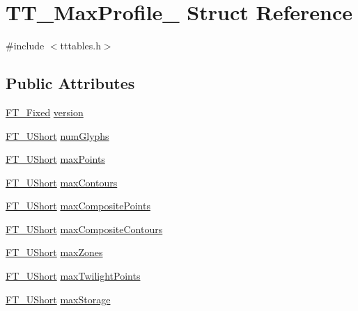 \hypertarget{struct_t_t___max_profile__}{\section{T\-T\-\_\-\-Max\-Profile\-\_\- Struct Reference}
\label{struct_t_t___max_profile__}
}


{\ttfamily \#include $<$tttables.\-h$>$}

\subsection*{Public Attributes}
\begin{DoxyCompactItemize}
\item 
\hyperlink{fttypes_8h_a5f5a679cc09f758efdd0d1c5feed3c3d}{F\-T\-\_\-\-Fixed} \hyperlink{struct_t_t___max_profile___a59618f7c572dadc58e883d32dea46380}{version}
\item 
\hyperlink{fttypes_8h_a937f6c17cf5ffd09086d8610c37b9f58}{F\-T\-\_\-\-U\-Short} \hyperlink{struct_t_t___max_profile___a6ec14b34978f24173d50ab556613ade5}{num\-Glyphs}
\item 
\hyperlink{fttypes_8h_a937f6c17cf5ffd09086d8610c37b9f58}{F\-T\-\_\-\-U\-Short} \hyperlink{struct_t_t___max_profile___a218fa149a195e9afa1738ef5aef07aa1}{max\-Points}
\item 
\hyperlink{fttypes_8h_a937f6c17cf5ffd09086d8610c37b9f58}{F\-T\-\_\-\-U\-Short} \hyperlink{struct_t_t___max_profile___a5af98bd8149008d0a33b61d9730262a9}{max\-Contours}
\item 
\hyperlink{fttypes_8h_a937f6c17cf5ffd09086d8610c37b9f58}{F\-T\-\_\-\-U\-Short} \hyperlink{struct_t_t___max_profile___aafc5ef3f58254792c353a6fb3b3a044e}{max\-Composite\-Points}
\item 
\hyperlink{fttypes_8h_a937f6c17cf5ffd09086d8610c37b9f58}{F\-T\-\_\-\-U\-Short} \hyperlink{struct_t_t___max_profile___a956e7c44e46a8aeb6d419b8550d1e556}{max\-Composite\-Contours}
\item 
\hyperlink{fttypes_8h_a937f6c17cf5ffd09086d8610c37b9f58}{F\-T\-\_\-\-U\-Short} \hyperlink{struct_t_t___max_profile___a07213312ec7b821a53a17d90930a478a}{max\-Zones}
\item 
\hyperlink{fttypes_8h_a937f6c17cf5ffd09086d8610c37b9f58}{F\-T\-\_\-\-U\-Short} \hyperlink{struct_t_t___max_profile___a907e28d69ad5e2a2c446e3eae8301af2}{max\-Twilight\-Points}
\item 
\hyperlink{fttypes_8h_a937f6c17cf5ffd09086d8610c37b9f58}{F\-T\-\_\-\-U\-Short} \hyperlink{struct_t_t___max_profile___a502a8579e3d358f3c00776ed0cc8a168}{max\-Storage}

\end{DoxyCompactItemize}
